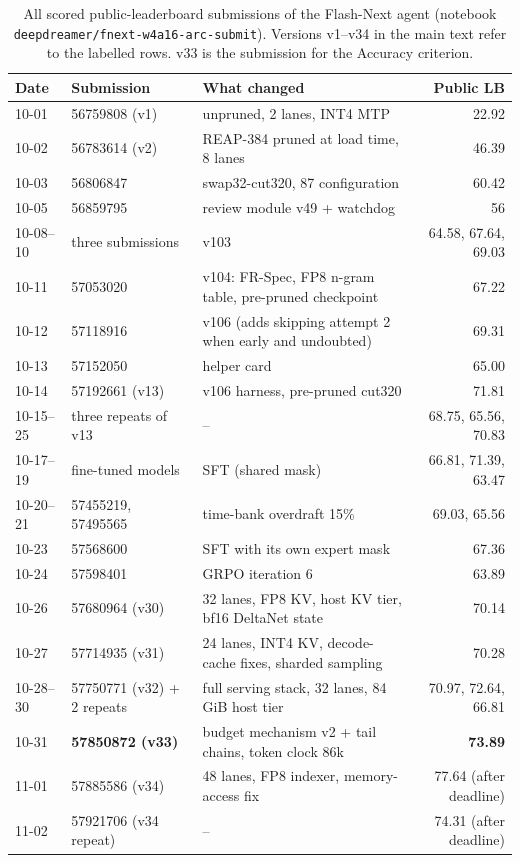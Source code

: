 \begin{table}[H]\centering\small
\begin{tabularx}{\linewidth}{@{}llXr@{}}
\toprule
Date & Submission & What changed & Public LB \\
\midrule
10-01 & 56759808 (v1) & unpruned, 2 lanes, INT4 MTP & 22.92 \\
10-02 & 56783614 (v2) & REAP-384 pruned at load time, 8 lanes & 46.39 \\
10-03 & 56806847 & swap32-cut320, 87 configuration & 60.42 \\
10-05 & 56859795 & review module v49 + watchdog & 56 \\
10-08--10 & three submissions & v103 & 64.58, 67.64, 69.03 \\
10-11 & 57053020 & v104: FR-Spec, FP8 n-gram table, pre-pruned checkpoint & 67.22 \\
10-12 & 57118916 & v106 (adds skipping attempt 2 when early and undoubted) & 69.31 \\
10-13 & 57152050 & helper card & 65.00 \\
10-14 & 57192661 (v13) & v106 harness, pre-pruned cut320 & 71.81 \\
10-15--25 & three repeats of v13 & -- & 68.75, 65.56, 70.83 \\
10-17--19 & fine-tuned models & SFT (shared mask) & 66.81, 71.39, 63.47 \\
10-20--21 & 57455219, 57495565 & time-bank overdraft 15\% & 69.03, 65.56 \\
10-23 & 57568600 & SFT with its own expert mask & 67.36 \\
10-24 & 57598401 & GRPO iteration 6 & 63.89 \\
10-26 & 57680964 (v30) & 32 lanes, FP8 KV, host KV tier, bf16 DeltaNet state & 70.14 \\
10-27 & 57714935 (v31) & 24 lanes, INT4 KV, decode-cache fixes, sharded sampling & 70.28 \\
10-28--30 & 57750771 (v32) + 2 repeats & full serving stack, 32 lanes, 84\,GiB host tier & 70.97, 72.64, 66.81 \\
10-31 & \textbf{57850872 (v33)} & budget mechanism v2 + tail chains, token clock 86k & \textbf{73.89} \\
11-01 & 57885586 (v34) & 48 lanes, FP8 indexer, memory-access fix & 77.64 (after deadline) \\
11-02 & 57921706 (v34 repeat) & -- & 74.31 (after deadline) \\
\bottomrule
\end{tabularx}
\caption{All scored public-leaderboard submissions of the Flash-Next agent (notebook \texttt{deepdreamer/fnext-w4a16-arc-submit}). Versions v1--v34 in the main text refer to the labelled rows. v33 is the submission for the Accuracy criterion.}\label{tab:lball}
\end{table}
